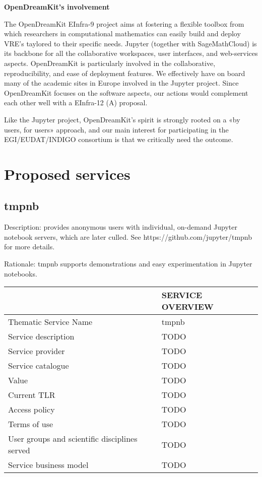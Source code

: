 \textbf{OpenDreamKit's involvement}

The OpenDreamKit EInfra-9 project aims at fostering a flexible toolbox
from which researchers in computational mathematics can easily build
and deploy VRE's taylored to their specific needs. Jupyter (together
with SageMathCloud) is its backbone for all the collaborative
workspaces, user interfaces, and web-services aspects. OpenDreamKit is
particularly involved in the collaborative, reproducibility, and ease
of deployment features. We effectively have on board many of the
academic sites in Europe involved in the Jupyter project. Since
OpenDreamKit focuses on the software aspects, our actions would
complement each other well with a EInfra-12 (A) proposal.

Like the Jupyter project, OpenDreamKit's spirit is strongly rooted on a «by users,
for users» approach, and our main interest for participating in the EGI/EUDAT/INDIGO consortium is that
we critically need the outcome.

\section{Proposed services}

\subsection{tmpnb}

Description: provides anonymous users with individual, on-demand Jupyter
notebook servers, which are later culled. See https://github.com/jupyter/tmpnb
for more details.

Rationale: tmpnb supports demonstrations and easy experimentation in
Jupyter notebooks.

\begin{tabular}{|l|l|}
\hline
 & SERVICE OVERVIEW\\
\hline
Thematic Service Name&tmpnb\\
\hline
Service description&TODO\\
\hline
Service provider&TODO\\
\hline
Service catalogue&TODO\\
\hline
Value&TODO\\
\hline
Current TLR&TODO\\
\hline
Access policy&TODO\\
\hline
Terms of use&TODO\\
\hline
User groups and scientific disciplines served&TODO\\
\hline
Service business model&TODO\\
\hline
\end{tabular}

